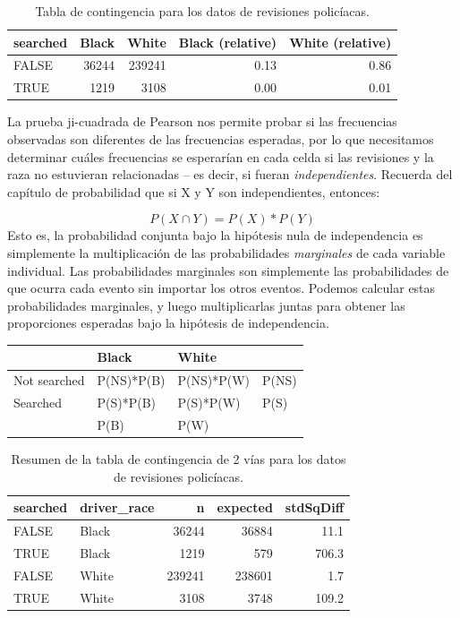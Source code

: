\documentclass[
  12pt,
]{book}
\begin{document}
\begin{table}

\caption{\label{tab:policeCT}Tabla de contingencia para los datos de revisiones policíacas.}
\centering
\begin{tabular}[t]{l|r|r|r|r}
\hline
searched & Black & White & Black (relative) & White (relative)\\
\hline
FALSE & 36244 & 239241 & 0.13 & 0.86\\
\hline
TRUE & 1219 & 3108 & 0.00 & 0.01\\
\hline
\end{tabular}
\end{table}

La prueba ji-cuadrada de Pearson nos permite probar si las frecuencias observadas son diferentes de las frecuencias esperadas, por lo que necesitamos determinar cuáles frecuencias se esperarían en cada celda si las revisiones y la raza no estuvieran relacionadas -- es decir, si fueran \emph{independientes}. Recuerda del capítulo de probabilidad que si X y Y son independientes, entonces:

\[
P(X \cap Y) = P(X) * P(Y)
\]
Esto es, la probabilidad conjunta bajo la hipótesis nula de independencia es simplemente la multiplicación de las probabilidades \emph{marginales} de cada variable individual. Las probabilidades marginales son simplemente las probabilidades de que ocurra cada evento sin importar los otros eventos. Podemos calcular estas probabilidades marginales, y luego multiplicarlas juntas para obtener las proporciones esperadas bajo la hipótesis de independencia.

\begin{longtable}[]{@{}llll@{}}
\toprule
& Black & White & \\
\midrule
\endhead
Not searched & P(NS)*P(B) & P(NS)*P(W) & P(NS) \\
Searched & P(S)*P(B) & P(S)*P(W) & P(S) \\
& P(B) & P(W) & \\
\bottomrule
\end{longtable}

\begin{table}

\caption{\label{tab:unnamed-chunk-67}Resumen de la tabla de contingencia de 2 vías para los datos de revisiones policíacas.}
\centering
\begin{tabular}[t]{l|l|r|r|r}
\hline
searched & driver\_race & n & expected & stdSqDiff\\
\hline
FALSE & Black & 36244 & 36884 & 11.1\\
\hline
TRUE & Black & 1219 & 579 & 706.3\\
\hline
FALSE & White & 239241 & 238601 & 1.7\\
\hline
TRUE & White & 3108 & 3748 & 109.2\\
\hline
\end{tabular}
\end{table}
\end{document}
